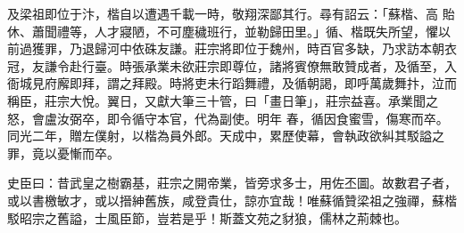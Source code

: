 \begin{pinyinscope}
 及梁祖即位于汴，楷自以遭遇千載一時，敬翔深鄙其行。尋有詔云：「蘇楷、高
 貽休、蕭聞禮等，人才寢陋，不可塵穢班行，並勒歸田里。」循、楷既失所望，懼以前過獲罪，乃退歸河中依硃友謙。莊宗將即位于魏州，時百官多缺，乃求訪本朝衣冠，友謙令赴行臺。時張承業未欲莊宗即尊位，諸將賓僚無敢贊成者，及循至，入衙城見府廨即拜，謂之拜殿。時將吏未行蹈舞禮，及循朝謁，即呼萬歲舞抃，泣而稱臣，莊宗大悅。翼日，又獻大筆三十管，曰「畫日筆」，莊宗益喜。承業聞之怒，會盧汝弼卒，即令循守本官，代為副使。明年
 春，循因食蜜雪，傷寒而卒。同光二年，贈左僕射，以楷為員外郎。天成中，累歷使幕，會執政欲糾其駁謚之罪，竟以憂慚而卒。



 史臣曰：昔武皇之樹霸基，莊宗之開帝業，皆旁求多士，用佐丕圖。故數君子者，或以書檄敏才，或以搢紳舊族，咸登貴仕，諒亦宜哉！唯蘇循贊梁祖之強禪，蘇楷駁昭宗之舊謚，士風臣節，豈若是乎！斯蓋文苑之豺狼，儒林之荊棘也。



\end{pinyinscope}